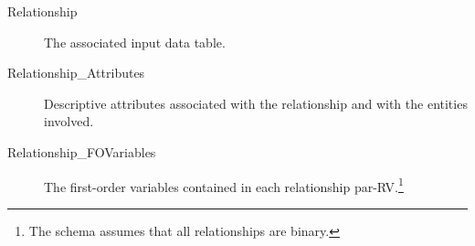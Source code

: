 \begin{description}
\item[Relationship] The associated input data table.
\item[Relationship\_Attributes] Descriptive attributes associated with the relationship and with the entities involved.
\item[Relationship\_FOVariables] The first-order variables contained in each relationship par-RV.\footnote{The schema assumes that all relationships are binary.}
\end{description}




\begin{table}[btp]
\caption{Translation from ER Diagram to Par-RVs}
 \centering
{}
 \label{table:translation}
\end{table}

